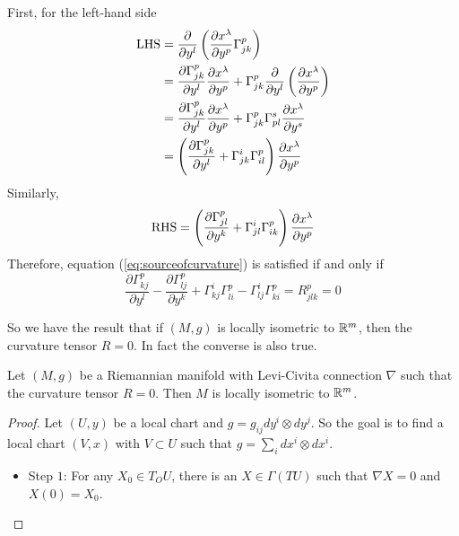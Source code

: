 \begin{enumerate}[label=\arabic{*}.]
\begin{rmk}
\begin{equation}
		\end{equation}
		First, for the left-hand side
		\begin{equation*}
			\begin{aligned}
				\text{LHS} &= \frac{\partial}{\partial y^l}\left(\frac{\partial x^\lambda}{\partial y^p}\Gamma^p_{jk}\right) \\
				&= \frac{\partial\Gamma^p_{jk} }{\partial y^l}\frac{\partial x^\lambda}{\partial y^p} + \Gamma^p_{jk}\frac{\partial}{\partial y^l}\left(\frac{\partial x^\lambda}{\partial y^p}\right) \\
				&= \frac{\partial\Gamma^p_{jk} }{\partial y^l}\frac{\partial x^\lambda}{\partial y^p} + \Gamma^p_{jk}\Gamma^s_{pl}\frac{\partial x^\lambda}{\partial y^s} \\
				&= \left(\frac{\partial\Gamma^p_{jk} }{\partial y^l}+ \Gamma^i_{jk}\Gamma^p_{il}\right)\frac{\partial x^\lambda}{\partial y^p}
			\end{aligned}
		\end{equation*}
		Similarly, 
		\begin{equation*}
			\text{RHS} = \left(\frac{\partial\Gamma^p_{jl} }{\partial y^k}+ \Gamma^i_{jl}\Gamma^p_{ik}\right)\frac{\partial x^\lambda}{\partial y^p}
		\end{equation*}
		Therefore, equation (\ref{eq:sourceofcurvature}) is satisfied if and only if
		\begin{equation*}
			\frac{\partial\Gamma^p_{kj} }{\partial y^l}-\frac{\partial\Gamma^p_{lj} }{\partial y^k} + \Gamma^i_{kj}\Gamma^p_{li} -\Gamma^i_{lj}\Gamma^p_{ki} = R^p_{jlk} = 0
		\end{equation*}
	\end{rmk}
	So we have the result that if $(M,g)$ is locally isometric to $\mathbb{R}^m$, then the curvature tensor $R=0$. In fact the converse is also true.
	\begin{thm}
		Let $(M,g)$ be a Riemannian manifold with Levi-Civita connection $\nabla$ such that the curvature tensor $R=0$. Then $M$ is locally isometric to $\mathbb{R}^m$.
	\end{thm}
	\begin{proof}
		Let $(U,y)$ be a local chart and $g = g_{ij}dy^i\otimes dy^j$. So the goal is to find a local chart $(V,x)$ with $V \subset U$ such that $g = \sum_i dx^i \otimes dx^i$.
		\begin{itemize}
			\item Step $1$: For any $X_0 \in T_OU$, there is an $X \in \Gamma(TU)$ such that $\nabla X = 0$ and $X(0)=X_0$.


\end{itemize}
\end{proof}
\end{enumerate}
